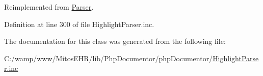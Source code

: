 \-Reimplemented from \hyperlink{class_parser_a29ffc8e33fce7331212a7636256a7678}{\-Parser}.



\-Definition at line 300 of file \-Highlight\-Parser.\-inc.



\-The documentation for this class was generated from the following file\-:\begin{DoxyCompactItemize}
\item 
\-C\-:/wamp/www/\-Mitos\-E\-H\-R/lib/\-Php\-Documentor/php\-Documentor/\hyperlink{_highlight_parser_8inc}{\-Highlight\-Parser.\-inc}\end{DoxyCompactItemize}
